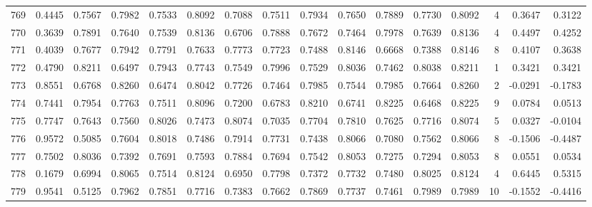 \begin{tabular}{lrrrrrrrrrrrrrrr}
769 &      0.4445 &  0.7567 &  0.7982 &  0.7533 &  0.8092 &  0.7088 &  0.7511 &  0.7934 &  0.7650 &  0.7889 &   0.7730 &     0.8092 &      4 &                    0.3647 &                     0.3122 \\
770 &      0.3639 &  0.7891 &  0.7640 &  0.7539 &  0.8136 &  0.6706 &  0.7888 &  0.7672 &  0.7464 &  0.7978 &   0.7639 &     0.8136 &      4 &                    0.4497 &                     0.4252 \\
771 &      0.4039 &  0.7677 &  0.7942 &  0.7791 &  0.7633 &  0.7773 &  0.7723 &  0.7488 &  0.8146 &  0.6668 &   0.7388 &     0.8146 &      8 &                    0.4107 &                     0.3638 \\
772 &      0.4790 &  0.8211 &  0.6497 &  0.7943 &  0.7743 &  0.7549 &  0.7996 &  0.7529 &  0.8036 &  0.7462 &   0.8038 &     0.8211 &      1 &                    0.3421 &                     0.3421 \\
773 &      0.8551 &  0.6768 &  0.8260 &  0.6474 &  0.8042 &  0.7726 &  0.7464 &  0.7985 &  0.7544 &  0.7985 &   0.7664 &     0.8260 &      2 &                   -0.0291 &                    -0.1783 \\
774 &      0.7441 &  0.7954 &  0.7763 &  0.7511 &  0.8096 &  0.7200 &  0.6783 &  0.8210 &  0.6741 &  0.8225 &   0.6468 &     0.8225 &      9 &                    0.0784 &                     0.0513 \\
775 &      0.7747 &  0.7643 &  0.7560 &  0.8026 &  0.7473 &  0.8074 &  0.7035 &  0.7704 &  0.7810 &  0.7625 &   0.7716 &     0.8074 &      5 &                    0.0327 &                    -0.0104 \\
776 &      0.9572 &  0.5085 &  0.7604 &  0.8018 &  0.7486 &  0.7914 &  0.7731 &  0.7438 &  0.8066 &  0.7080 &   0.7562 &     0.8066 &      8 &                   -0.1506 &                    -0.4487 \\
777 &      0.7502 &  0.8036 &  0.7392 &  0.7691 &  0.7593 &  0.7884 &  0.7694 &  0.7542 &  0.8053 &  0.7275 &   0.7294 &     0.8053 &      8 &                    0.0551 &                     0.0534 \\
778 &      0.1679 &  0.6994 &  0.8065 &  0.7514 &  0.8124 &  0.6950 &  0.7798 &  0.7372 &  0.7732 &  0.7480 &   0.8025 &     0.8124 &      4 &                    0.6445 &                     0.5315 \\
779 &      0.9541 &  0.5125 &  0.7962 &  0.7851 &  0.7716 &  0.7383 &  0.7662 &  0.7869 &  0.7737 &  0.7461 &   0.7989 &     0.7989 &     10 &                   -0.1552 &                    -0.4416 \\

\end{tabular}
